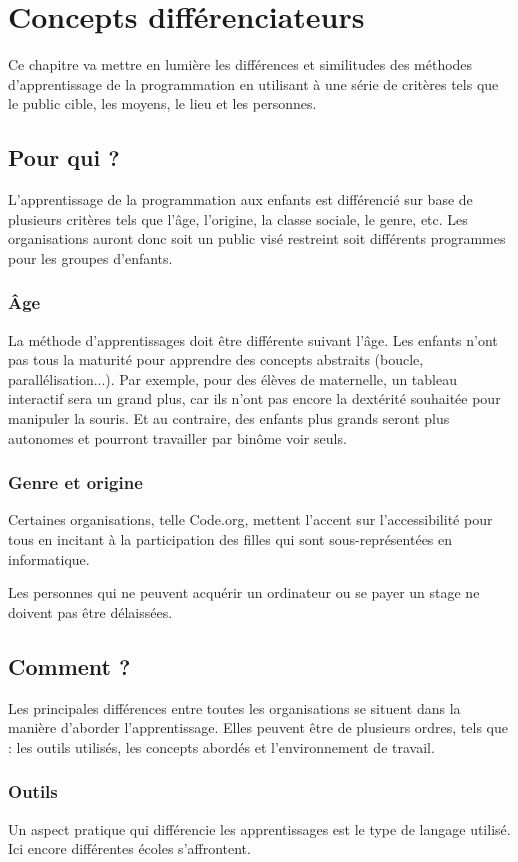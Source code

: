 \section{Concepts différenciateurs}
\label{concepts}
Ce chapitre va mettre en lumière les différences et similitudes des méthodes d'apprentissage de la programmation en utilisant à une série de critères tels que le public cible, les moyens, le lieu et les personnes.
\subsection{Pour qui ?}
L'apprentissage de la programmation aux enfants est différencié sur base de plusieurs critères tels que l'âge, l'origine, la classe sociale, le genre, etc. Les organisations auront donc soit un public visé restreint soit différents programmes pour les groupes d'enfants.

\subsubsection{Âge}
La méthode d'apprentissages doit être différente suivant l'âge. Les enfants n'ont pas tous la maturité pour apprendre des concepts abstraits (boucle, parallélisation...). Par exemple, pour des élèves de maternelle, un tableau interactif sera un grand plus, car ils n'ont pas encore la dextérité souhaitée pour manipuler la souris. Et au contraire, des enfants plus grands seront plus autonomes et pourront travailler par binôme voir seuls.

\subsubsection{Genre et origine}
Certaines organisations, telle Code.org, mettent l'accent sur l’accessibilité pour tous en incitant à la participation des filles qui sont sous-représentées en informatique.

Les personnes qui ne peuvent acquérir un ordinateur ou se payer un stage ne doivent pas être délaissées.

\subsection{Comment ?}
Les principales différences entre toutes les organisations se situent dans la manière d'aborder l'apprentissage. Elles peuvent être de plusieurs ordres, tels que : les outils utilisés, les concepts abordés et l'environnement de travail.

\subsubsection{Outils}
Un aspect pratique qui différencie les apprentissages est le type de langage utilisé. Ici encore différentes écoles s'affrontent.

